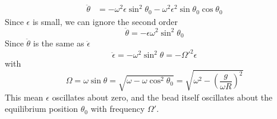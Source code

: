 \documentclass[../../../main.tex]{subfiles}
\begin{document}
\begin{enumerate}
\begin{align*}
        \ddot{\theta}&=-\omega^2\epsilon\sin^2\theta_0-\omega^2\epsilon^2\sin\theta_0\cos\theta_0
    \end{align*}
    Since $\epsilon$ is small, we can ignore the second order
    \begin{equation*}
        \ddot{\theta}=-\epsilon\omega^2\sin^2\theta_0
    \end{equation*} 
    Since $\ddot{\theta}$ is the same as $\ddot{\epsilon}$
    \begin{equation*}
        \ddot{\epsilon}=-\omega^2\sin^2\theta=-\Omega'^2\epsilon
    \end{equation*}
    with 
    \begin{equation*}
        \Omega=\omega\sin\theta=\sqrt{\omega-\omega\cos^2\theta_0}=\sqrt{\omega^2-\left(\frac{g}{\omega R}\right)^2}
    \end{equation*}
    This mean $\epsilon$ oscillates about zero, and the bead itself oscillates about the equilibrium position $\theta_0$ with frequency $\Omega'$.
\end{enumerate}
\end{document}
